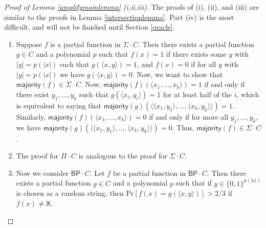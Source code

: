 \documentclass[11pt]{article}
\newcommand{\pr}{\text{Pr}}
\newcommand{\bp}{\textsf{BP}}
\newcommand{\x}{\textsf{X}}
\newcommand{\intersect}{\textsf{intersect}}
\newcommand{\majority}{\textsf{majority}}
\begin{document}
\begin{proof}[Proof of Lemma \ref{amplifymainlemma} (i,ii,iii)]

 The proofs of (i), (ii), and (iii) are similar to the proofs in Lemma \ref{intersectionlemma}. Part (iv) is the most difficult, and will not be finished until Section \ref{oracle}.
\begin{enumerate}
\item[(i)] Suppose $f$ is a partial function in $\Sigma\cdot C$. Then there exists a partial function $g\in C$ and a polynomial $p$ such that $f(x) = 1$ if there exists some $y$ with $|y| = p(|x|)$ such that $g(\langle x,y\rangle) = 1$, and $f(x) = 0$ if for all $y$ with $|y| = p(|x|)$ we have $g(\langle x, y\rangle) = 0$. Now, we want to show that $\majority(f) \in \Sigma \cdot C$. Now, $\majority(f)(\langle x_1,...,x_k\rangle) = 1$ if and only if there exist $y_1,...,y_k$ such that $g(\langle x_i, y_i\rangle) = 1$ for at least half of the $i$, which is equivalent to saying that $\majority(g)(\langle \langle x_1,y_1\rangle,...,\langle x_k,y_k\rangle\rangle) = 1$. Similarly, $\majority(f)(\langle x_1,...,x_k\rangle) = 0$ if and only if for more all $y_1,...,y_k$, we have $\majority(g)(\langle \langle x_1,y_1\rangle,...,\langle x_k,y_k\rangle\rangle) = 0$. Thus, $\majority(f) \in \Sigma \cdot C$.

\item[(ii)] The proof for $\Pi \cdot C$ is analogous to the proof for $\Sigma \cdot C$.
\item[(iii)] Now we consider $\bp \cdot C$. Let $f$ be a partial function in $\bp \cdot C$. Then there exists a partial function $g \in C$ and a polynomial $p$ such that if $y \in \{0,1\}^{p(|x|)}$ is chosen as a random string, then $\pr[f(x) = g(\langle x,y\rangle)] > 2/3$ if $f(x) \ne \x$.


\end{enumerate}
\end{proof}
\end{document}
